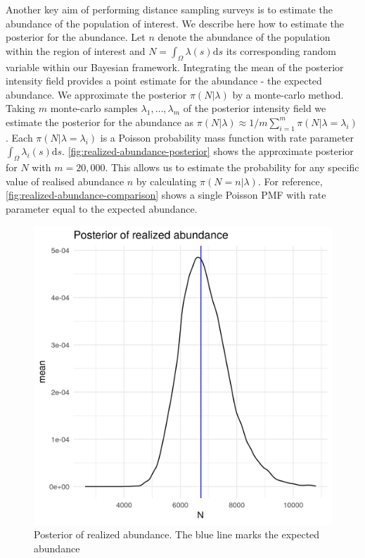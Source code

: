 \documentclass[preprint,12pt]{elsarticle}
\begin{document}
Another key aim of performing distance sampling surveys is to estimate the abundance of the population of interest.  We describe here how to estimate the posterior for the abundance. Let $n$ denote the abundance of the population within the region of interest and $N = \int_{\Omega}\lambda(s)\mathrm{d}s$ its corresponding random variable within our Bayesian framework.  Integrating the mean of the posterior intensity field provides a point estimate for the abundance - the expected abundance.  We approximate the posterior $\pi(N | \lambda)$ by a monte-carlo method.  Taking $m$ monte-carlo samples  $\lambda_1, \ldots, \lambda_m$ of the posterior intensity field we estimate the posterior for the abundance as $\pi(N | \lambda) \approx 1 / m \sum_{i=1}^m \pi (N | \lambda = \lambda_i)$. Each $\pi(N | \lambda = \lambda_i)$ is a Poisson probability mass function with rate parameter $\int_{\Omega}\lambda_i(s)\mathrm{d}s$. \autoref{fig:realized-abundance-posterior} shows the approximate posterior for $N$ with $m = 20,000$.  This allows us to estimate the probability for any specific value of realised abundance $n$ by calculating $\pi(N = n | \lambda)$.  For reference, \autoref{fig:realized-abundance-comparison} shows a single Poisson PMF with rate parameter equal to the expected abundance.
\begin{figure}
	\includegraphics[scale=0.6]{figures/realized_abundance_posterior.png}
	\caption{Posterior of realized abundance.  The blue line marks the expected abundance}
	\label{fig:realized-abundance-posterior}
\end{figure}
\end{document}
